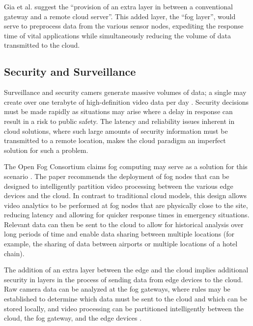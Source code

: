 \documentclass{article}
\begin{document}
Gia et al. \cite{gia2015fog} suggest the ``provision of an extra layer in between a conventional gateway and a remote cloud server''. This added layer, the ``fog layer'', would serve to preprocess data from the various sensor nodes, expediting the response time of vital applications while simultaneously reducing the volume of data transmitted to the cloud.

\subsection{Security and Surveillance}
Surveillance and security camers generate massive volumes of data; a single may create over one terabyte of high-definition video data per day \cite{openfogconsortium2017visualsecurity}. Security decisions must be made rapidly as situations may arise where a delay in response can result in a risk to public safety. The latency and reliability issues inherent in cloud solutions, where such large amounts of security information must be transmitted to a remote location, makes the cloud paradigm an imperfect solution for such a problem.

The Open Fog Consortium claims fog computing may serve as a solution for this scenario \cite{openfogconsortium2017visualsecurity}. The paper recommends the deployment of fog nodes that can be designed to intelligently partition video processing between the various edge devices and the cloud. In contrast to traditional cloud models, this design allows video analytics to be performed at fog nodes that are physically close to the site, reducing latency and allowing for quicker response times in emergency situations. Relevant data can then be sent to the cloud to allow for historical analysis over long periods of time and enable data sharing between multiple locations \cite{openfogconsortium2017visualsecurity} (for example, the sharing of data between airports or multiple locations of a hotel chain).

The addition of an extra layer between the edge and the cloud implies additional security in layers in the process of sending data from edge devices to the cloud. Raw camera data can be analyzed at the fog gateways, where rules may be established to determine which data must be sent to the cloud and which can be stored locally, and video processing can be partitioned intelligently between the cloud, the fog gateway, and the edge devices \cite{openfogconsortium2017visualsecurity}.
\end{document}
